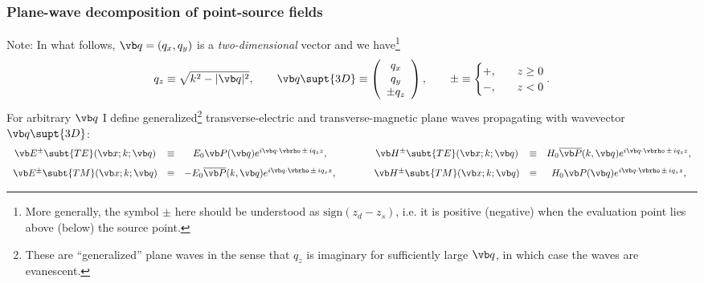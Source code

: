 \documentclass[letterpaper]{article}
\begin{document}
\subsubsection{Plane-wave decomposition of point-source fields}

Note: In what follows,
$\vb q=(q_x,q_y)$ is a \textit{two-dimensional} vector and we
have\footnote{More generally, the symbol $\pm$ here should be understood
as $\text{sign}(z_d - z_s)$, i.e. it is positive (negative) when the evaluation 
point lies above (below) the source point.}
$$ q_z \equiv \sqrt{k^2 - |\vb q|^2}, 
   \qquad
   \vb q\supt{3D}\equiv
   \left(\begin{array}{c}q_x \\ q_y \\ \pm q_z \end{array}\right), 
   \qquad
   \pm \equiv
   \begin{cases}
     +, \quad & z\ge 0 \\ 
     -, \quad & z<   0
   \end{cases}.
$$
For arbitrary $\vb q$ I define generalized\footnote{These 
are ``generalized'' plane waves in the sense that $q_z$ is 
imaginary for sufficiently large $\vb q$, in which case the 
waves are evanescent.} transverse-electric and
transverse-magnetic plane waves propagating with wavevector
$\vb q\supt{3D}$:
$$\begin{array}{ccccccc}
 \vb E^{\pm} \subt{TE}(\vb x; k; \vb q)
   &\equiv& E_0 \vb P(\vb q) e^{i\vb q \cdot \vbrho \, \pm \, iq_z z},
   &\qquad&
 \vb H^{\pm} \subt{TE}(\vb x; k; \vb q)
   &\equiv& H_0 \overline{\vb P}(k, \vb q) e^{i\vb q \cdot \vbrho \, \pm \, iq_z z},
\\[8pt]
 \vb E^{\pm} \subt{TM}(\vb x; k; \vb q)
   &\equiv& -E_0 \overline{\vb P}(k,\vb q) e^{i\vb q \cdot \vbrho \, \pm \, iq_z z},
   &\qquad&
 \vb H^{\pm} \subt{TM}(\vb x; k; \vb q)
   &\equiv& H_0 \vb P(\vb q) e^{i\vb q \cdot \vbrho \, \pm \, iq_z z},
\end{array}$$
\end{document}
